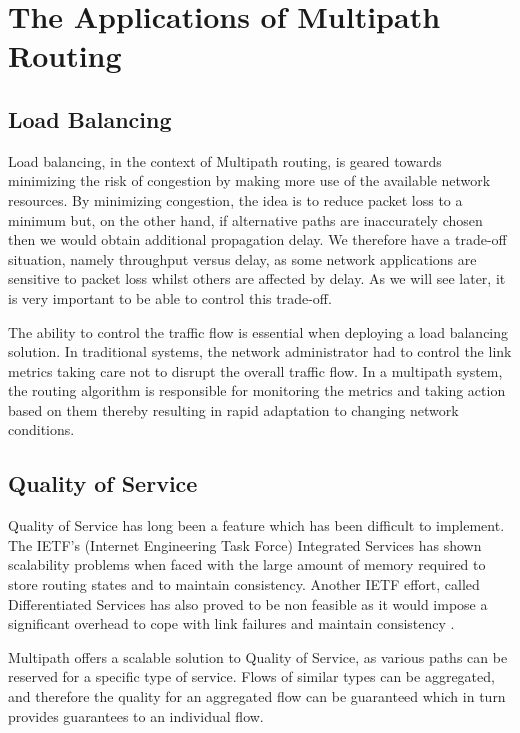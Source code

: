 \section{The Applications of Multipath Routing}

\subsection{Load Balancing}

Load balancing, in the context of Multipath routing, is geared towards minimizing
the risk of congestion by making more use of the available network resources. By
minimizing congestion, the idea is to reduce packet loss to a minimum but, on
the other hand, if alternative paths are inaccurately chosen then we would
obtain additional propagation delay. We therefore have a trade-off situation,
namely throughput versus delay, as some network applications are sensitive to
packet loss whilst others are affected by delay. As we will see later, it is
very important to be able to control this trade-off.

The ability to control the traffic flow is essential when deploying a load
balancing solution. In traditional systems, the network administrator had to
control the link metrics taking care not to disrupt the overall traffic flow. In
a multipath system, the routing algorithm is responsible for monitoring the
metrics and taking action based on them thereby resulting in rapid adaptation to
changing network conditions.

\subsection{Quality of Service}

Quality of Service has long been a feature which has been difficult to
implement. The IETF's (Internet Engineering Task Force) Integrated Services has
shown scalability problems when faced with the large amount of memory required
to store routing states and to maintain consistency. Another IETF effort, called
Differentiated Services has also proved to be non feasible as it would impose a
significant overhead to cope with link failures and maintain consistency \cite{DiffServLimits}.

Multipath offers a scalable solution to Quality of Service, as various paths can
be reserved for a specific type of service. Flows of similar types can be
aggregated, and therefore the quality for an aggregated flow can be guaranteed which in
turn provides guarantees to an individual flow.

